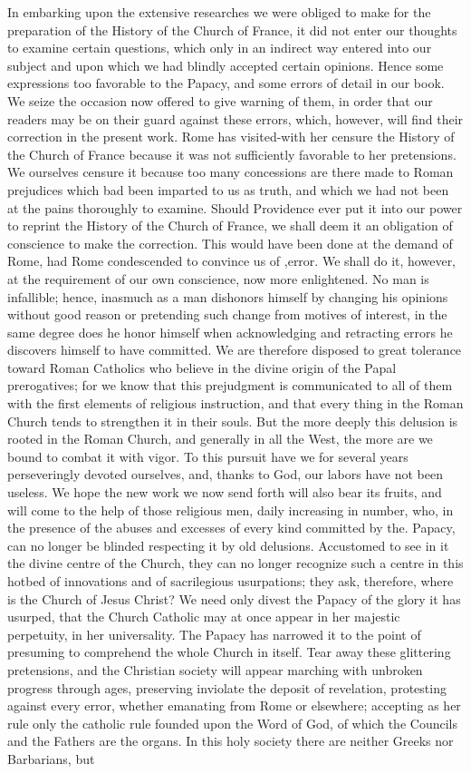In embarking upon the extensive researches we were obliged to make for the preparation of the History of the Church of France, it did not enter our thoughts to examine certain questions, which only in an indirect way entered into our subject and upon which we had blindly accepted certain opinions. Hence some expressions too favorable to the Papacy, and some errors of detail in our book. We seize the occasion now offered to give warning of them, in order that our readers may be on their guard against these errors, which, however, will find their correction in the present work. Rome has visited-with her censure the History of the Church of France because it was not sufficiently favorable to her pretensions. We ourselves censure it because too many concessions are there made to Roman prejudices which bad been imparted to us as truth, and which we had not been at the pains thoroughly to examine. Should Providence ever put it into our power to reprint the History of the Church of France, we shall deem it an obligation of conscience to make the correction. This would have been done at the demand of Rome, had Rome condescended to convince us of ,error. We shall do it, however, at the requirement of our own conscience, now more enlightened. No man is infallible; hence, inasmuch as a man dishonors himself by changing his opinions without good reason or pretending such change from motives of interest, in the same degree does he honor himself when acknowledging and retracting errors he discovers himself to have committed. We are therefore disposed to great tolerance toward Roman Catholics who believe in the divine origin of the Papal prerogatives; for we know that this prejudgment is communicated to all of them with the first elements of religious instruction, and that every thing in the Roman Church tends to strengthen it in their souls. But the more deeply this delusion is rooted in the Roman Church, and generally in all the West, the more are we bound to combat it with vigor. To this pursuit have we for several years perseveringly devoted ourselves, and, thanks to God, our labors have not been useless. We hope the new work we now send forth will also bear its fruits, and will come to the help of those religious men, daily increasing in number, who, in the presence of the abuses and excesses of every kind committed by the. Papacy, can no longer be blinded respecting it by old delusions. Accustomed to see in it the divine centre of the Church, they can no longer recognize such a centre in this hotbed of innovations and of sacrilegious usurpations; they ask, therefore, where is the Church of Jesus Christ? We need only divest the Papacy of the glory it has usurped, that the Church Catholic may at once appear in her majestic perpetuity, in her universality. The Papacy has narrowed it to the point of presuming to comprehend the whole Church in itself. Tear away these glittering pretensions, and the Christian society will appear marching with unbroken progress through ages, preserving inviolate the deposit of revelation, protesting against every error, whether emanating from Rome or elsewhere; accepting as her rule only the catholic rule founded upon the Word of God, of which the Councils and the Fathers are the organs. In this holy society there are neither Greeks nor Barbarians, but 
